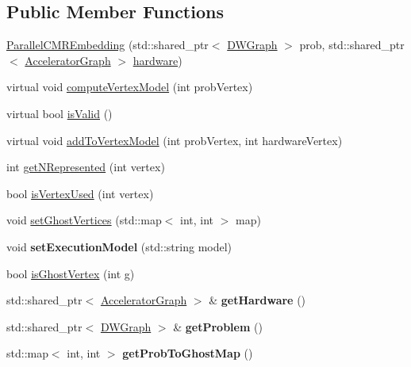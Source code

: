 \subsection*{Public Member Functions}
\begin{DoxyCompactItemize}
\item 
\hyperlink{a00093_a7bad0996c759a5c3a8f325b4c3eb7b90}{Parallel\+C\+M\+R\+Embedding} (std\+::shared\+\_\+ptr$<$ \hyperlink{a00043}{D\+W\+Graph} $>$ prob, std\+::shared\+\_\+ptr$<$ \hyperlink{a00064}{Accelerator\+Graph} $>$ \hyperlink{a00051_a63d22756b8ad0f1a689b46d17a0ce81e}{hardware})
\item 
virtual void \hyperlink{a00093_a2d9a99786af28f38134f0243d231bb35}{compute\+Vertex\+Model} (int prob\+Vertex)
\item 
virtual bool \hyperlink{a00093_a74606fda2c0542c2d197146787969bd4}{is\+Valid} ()
\item 
virtual void \hyperlink{a00093_a55ba8c7ae717cbfa8a57503116536344}{add\+To\+Vertex\+Model} (int prob\+Vertex, int hardware\+Vertex)
\item 
int \hyperlink{a00093_a7f18154f9ba79fb4bee03543e75cddb5}{get\+N\+Represented} (int vertex)
\item 
bool \hyperlink{a00093_a70955f1c3534bc9da12c3956b11a7820}{is\+Vertex\+Used} (int vertex)
\item 
void \hyperlink{a00093_ae5a7423f3c2655a8c2364bc5c389b796}{set\+Ghost\+Vertices} (std\+::map$<$ int, int $>$ map)
\item 
void {\bfseries set\+Execution\+Model} (std\+::string model)\hypertarget{a00093_a51a93e8c46a997c48c7514763770c079}{}\label{a00093_a51a93e8c46a997c48c7514763770c079}

\item 
bool \hyperlink{a00093_a6fbb695c060ff00be3134c874ff82a6c}{is\+Ghost\+Vertex} (int g)
\item 
std\+::shared\+\_\+ptr$<$ \hyperlink{a00064}{Accelerator\+Graph} $>$ \& {\bfseries get\+Hardware} ()\hypertarget{a00093_a385340fd3fe411251d2529fbc2f4a5a4}{}\label{a00093_a385340fd3fe411251d2529fbc2f4a5a4}

\item 
std\+::shared\+\_\+ptr$<$ \hyperlink{a00043}{D\+W\+Graph} $>$ \& {\bfseries get\+Problem} ()\hypertarget{a00093_a0b8aec8a62d1c552174bce92a080cc04}{}\label{a00093_a0b8aec8a62d1c552174bce92a080cc04}

\item 
std\+::map$<$ int, int $>$ {\bfseries get\+Prob\+To\+Ghost\+Map} ()\hypertarget{a00093_aa835ef8197250447500f2e17c618a353}{}\label{a00093_aa835ef8197250447500f2e17c618a353}

\end{DoxyCompactItemize}
